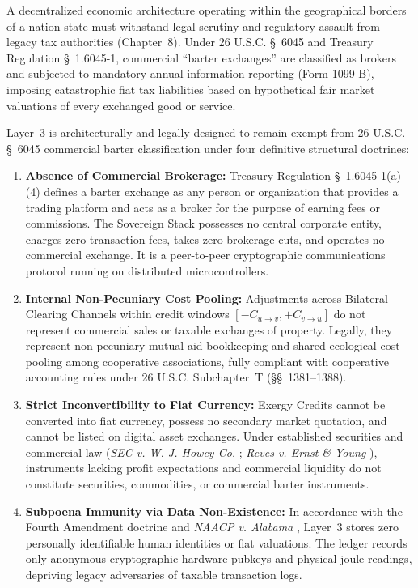 A decentralized economic architecture operating within the geographical borders of a nation-state must withstand legal scrutiny and regulatory assault from legacy tax authorities (Chapter~8). Under 26 U.S.C. \S~6045 and Treasury Regulation \S~1.6045-1, commercial ``barter exchanges'' are classified as brokers and subjected to mandatory annual information reporting (Form 1099-B), imposing catastrophic fiat tax liabilities based on hypothetical fair market valuations of every exchanged good or service.

Layer~3 is architecturally and legally designed to remain exempt from 26 U.S.C. \S~6045 commercial barter classification under four definitive structural doctrines:

\begin{enumerate}
  \item \textbf{Absence of Commercial Brokerage:} Treasury Regulation \S~1.6045-1(a)(4) defines a barter exchange as any person or organization that provides a trading platform and acts as a broker for the purpose of earning fees or commissions. The Sovereign Stack possesses no central corporate entity, charges zero transaction fees, takes zero brokerage cuts, and operates no commercial exchange. It is a peer-to-peer cryptographic communications protocol running on distributed microcontrollers.
  \item \textbf{Internal Non-Pecuniary Cost Pooling:} Adjustments across Bilateral Clearing Channels within credit windows $[-C_{u \to v}, +C_{v \to u}]$ do not represent commercial sales or taxable exchanges of property. Legally, they represent non-pecuniary mutual aid bookkeeping and shared ecological cost-pooling among cooperative associations, fully compliant with cooperative accounting rules under 26 U.S.C. Subchapter~T (\S\S~1381--1388).
  \item \textbf{Strict Inconvertibility to Fiat Currency:} Exergy Credits cannot be converted into fiat currency, possess no secondary market quotation, and cannot be listed on digital asset exchanges. Under established securities and commercial law (\textit{SEC v. W. J. Howey Co.} \parencite{howey1946}; \textit{Reves v. Ernst \& Young} \parencite{reves1990}), instruments lacking profit expectations and commercial liquidity do not constitute securities, commodities, or commercial barter instruments.
  \item \textbf{Subpoena Immunity via Data Non-Existence:} In accordance with the Fourth Amendment doctrine and \textit{NAACP v. Alabama} \parencite{naacp1958}, Layer~3 stores zero personally identifiable human identities or fiat valuations. The ledger records only anonymous cryptographic hardware pubkeys and physical joule readings, depriving legacy adversaries of taxable transaction logs.
\end{enumerate}


